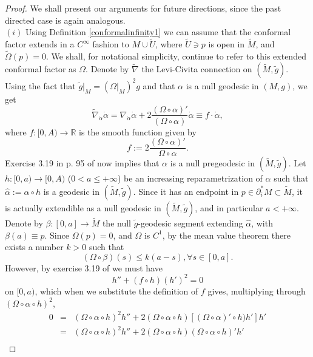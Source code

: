 \begin{proof} We shall present our arguments for future directions, since the past directed case is again analogous. \\
$(i)$ Using Definition \ref{conformalinfinity1} we can assume that the conformal factor extends in a $C^{\infty}$ fashion to $M\cup \tilde{U}$, where $\tilde{U} \ni p$ is open in $\tilde{M}$, and $\tilde{\Omega}(p)=0$. We shall, for notational simplicity, continue to refer to this extended conformal factor as $\Omega$. Denote by $\tilde{\nabla}$ the Levi-Civita connection on $(\tilde{M},\tilde{g})$. Using the fact that $\tilde{g}|_M = (\Omega|_M)^2 g$ and that $\alpha$ is a null geodesic in $(M,g)$, we get
\begin{equation}
\label{geodesic}
\tilde{\nabla}_{\dot{\alpha} }\dot{\alpha} = \nabla_{\dot{\alpha}}\dot{\alpha} + 2\frac{(\Omega \circ \alpha)'}{(\Omega \circ \alpha)} \dot{\alpha} \equiv f \cdot \dot{\alpha},
\end{equation}
where $f:[0,A) \rightarrow \mathbb{R}$ is the smooth function given by
\[
f := 2\frac{(\Omega \circ \alpha)'}{\Omega \circ \alpha}.
\]
Exercise 3.19 in p. 95 of \cite{ONeillSemiRiemannianGeometryApplications1983} now implies that $\alpha$ is a null pregeodesic in $(\tilde{M},\tilde{g})$. Let $h:[0,a) \rightarrow [0,A)$ ($0<a \leq +\infty$) be an increasing reparametrization of $\alpha$ such that $\hat{\alpha}:= \alpha \circ h$ is a geodesic in $(\tilde{M},\tilde{g})$. Since it has an endpoint in $p \in \partial^{*}_i M \subset \tilde{M}$, it is actually extendible as a null geodesic in $(\tilde{M},\tilde{g})$, and in particular $a <+\infty$. Denote by $\beta:[0,a] \rightarrow \tilde{M}$ the null $\tilde{g}$-geodesic segment extending $\hat{\alpha}$, with $\beta(a) \equiv p$. Since $\Omega(p) =0$, and $\Omega$ is $C^1$, by the mean value theorem there exists a number $k>0$ such that
\begin{equation}
\label{lipschitz}
(\Omega \circ \beta)(s) \leq k (a - s), \forall s \in [0,a].
\end{equation}
However, by exercise 3.19 of \cite{ONeillSemiRiemannianGeometryApplications1983} we must have
\[
h'' + (f \circ h) (h')^2 =0
\]
on $[0,a)$, which when we substitute the definition of $f$ gives, multiplying through $(\Omega \circ \alpha \circ h)^2$,
\begin{eqnarray}
0 &=& (\Omega \circ \alpha \circ h)^2 h'' + 2 (\Omega \circ \alpha \circ h)[(\Omega \circ \alpha)'\circ h)h ']h' \\ \nonumber
&=& (\Omega \circ \alpha \circ h)^2 h'' + 2 (\Omega \circ \alpha \circ h)(\Omega \circ \alpha \circ h)'h' \\ \nonumber

\end{eqnarray}
\end{proof}
